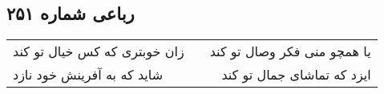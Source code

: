 \begin{center}
\section*{رباعی شماره ۲۵۱}
\label{sec:sh251}
\begin{longtable}{l p{0.5cm} r}
زان خوبتری که کس خیال تو کند
&&
یا همچو منی فکر وصال تو کند
\\
شاید که به آفرینش خود نازد
&&
ایزد که تماشای جمال تو کند
\\
\end{longtable}
\end{center}
